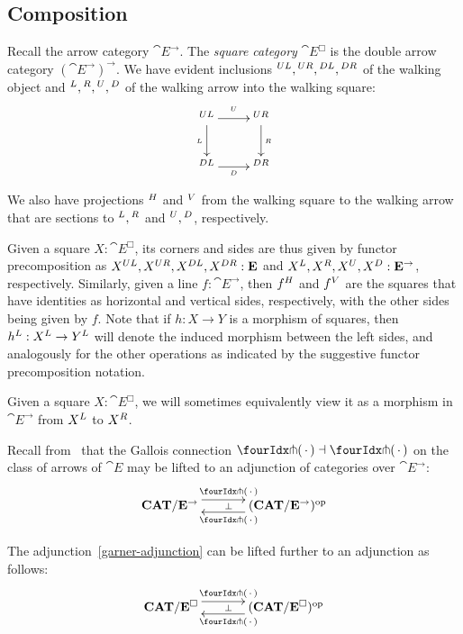\documentclass[reqno,10pt,a4paper,oneside]{amsart}
\begin{document}
\subsection{Composition}

Recall the arrow category $\cat{E}^{\to}$.
The \emph{square category} $\cat{E}^{\Box}$ is the double arrow category $(\cat{E}^{\to})^{\to}$.
We have evident inclusions ${}^{UL}, {}^{UR}, {}^{DL}, {}^{DR}$ of the walking object and ${}^L, {}^R, {}^U, {}^D$ of the walking arrow into the walking square:
\[
\xymatrix{
  \squl
  \ar[r]^{\squ}
  \ar[d]_{\sql}
  \ar@{}[dr]
&
  \squr
  \ar[d]^{\sqr}
\\
  \sqdl
  \ar[r]_{\sqd}
&
  \sqdr
}
\]
We also have projections ${}^{H}$ and ${}^{V}$ from the walking square to the walking arrow that are sections to ${}^L, {}^R$ and ${}^U, {}^D$, respectively.

Given a square $X : \cat{E}^{\Box}$, its corners and sides are thus given by functor precomposition as $X{}^{UL}, X{}^{UR}, X{}^{DL}, X{}^{DR} : \mathbf{E}$ and $X{}^L, X{}^R, X{}^U, X{}^D : \mathbf{E}^{\to}$, respectively.
Similarly, given a line $f : \cat{E}^{\to}$, then $f{}^{H}$ and $f{}^{V}$ are the squares that have identities as horizontal and vertical sides, respectively, with the other sides being given by $f$.
Note that if $h : X \to Y$ is a morphism of squares, then \eg $h{}^L : X{}^L \to Y{}^L$ will denote the induced morphism between the left sides, and analogously for the other operations as indicated by the suggestive functor precomposition notation.

Given a square $X : \cat{E}^{\Box}$, we will sometimes equivalently view it as a morphism in $\cat{E}^{\to}$ from $X{}^L$ to $X{}^R$.

Recall from~\cite{garner:small-object-argument} that the Gallois connection $\liftl{\brarghole} \dashv \liftr{\brarghole}$ on the class of arrows of $\cat{E}$ may be lifted to an adjunction of categories over $\cat{E}^{\to}$:
\begin{equation}
\label{garner-adjunction}
\begin{gathered}
\xymatrix@C+1em{
  \CAT/\cat{E}^{\to}
  \ar@<5pt>[r]^{\liftl{\brarghole}}
  \ar@{}[r]|{\bot}
&
  (\CAT/\cat{E}^{\to})^{\op}
  \ar@<5pt>[l]^{\liftr{\brarghole}}
}
\end{gathered}
\end{equation}

\begin{lemma}
\label{garner-adjunction-extended}
The adjunction~\eqref{garner-adjunction} can be lifted further to an adjunction as follows:
\begin{equation}
\label{garner-adjunction-extended}
\begin{gathered}
\xymatrix@C+1em{
  \CAT/\cat{E}^{\Box}
  \ar@<5pt>[r]^{\liftl{\brarghole}}
  \ar@{}[r]|{\bot}
&
  (\CAT/\cat{E}^{\Box})^{\op}
  \ar@<5pt>[l]^{\liftr{\brarghole}}
}
\end{gathered}
\end{equation}
\end{lemma}
\end{document}
